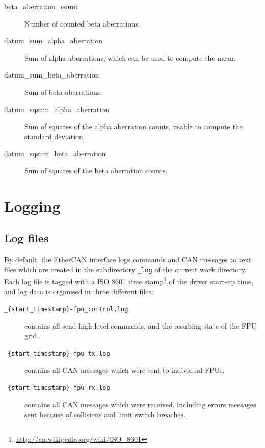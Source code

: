 \documentclass[fontsize=12,a4paper]{scrreprt}
\begin{document}
\begin{description}
  \item[beta\_aberration\_count] Number of counted beta aberrations.
  \item[datum\_sum\_alpha\_aberration] Sum of alpha aberrations, which can be used to compute the mean.
  \item[datum\_sum\_beta\_aberration] Sum of beta aberrations.
  \item[datum\_sqsum\_alpha\_aberration] Sum of squares of the alpha aberration counts, usable to compute the standard deviation.
  \item[datum\_sqsum\_beta\_aberration] Sum of squares of the beta aberration counts.

\end{description}

\chapter{Logging}
\label{sec:logging}
\section{Log files}

\minitoc


By default, the EtherCAN interface logs commands and CAN messages to text files
which are created in the subdirectory \texttt{\_log} of the current
work directory. Each log file is tagged with a ISO 8601 time
stamp\footnote{\url{http://en.wikipedia.org/wiki/ISO\_8601}} of the
driver start-up time, and log data is organised in three different
files:

\begin{description}
\item[\texttt{\_\{start\_timestamp\}-fpu\_control.log}] contains all
  send high-level commands, and the resulting state of the FPU grid.

\item[\texttt{\_\{start\_timestamp\}-fpu\_tx.log}] contains all CAN messages which were sent to individual FPUs.
\item[\texttt{\_\{start\_timestamp\}-fpu\_rx.log}] contains all CAN
  messages which were received, including errors messages sent because
  of collisions and limit switch breaches.

\end{description}
\end{document}
